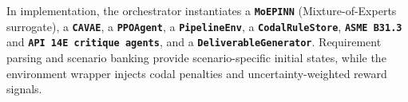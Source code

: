 \documentclass[conference]{IEEEtran}
\begin{document}
In implementation, the orchestrator instantiates a \texttt{\textbf{MoEPINN}} (Mixture-of-Experts surrogate), a \texttt{\textbf{CAVAE}}, a \texttt{\textbf{PPOAgent}}, a \texttt{\textbf{PipelineEnv}}, a \texttt{\textbf{CodalRuleStore}}, \texttt{\textbf{ASME B31.3}} and \texttt{\textbf{API 14E critique agents}}, and a \texttt{\textbf{DeliverableGenerator}}. Requirement parsing and scenario banking provide scenario-specific initial states, while the environment wrapper injects codal penalties and uncertainty-weighted reward signals.
 














 
\end{document}
